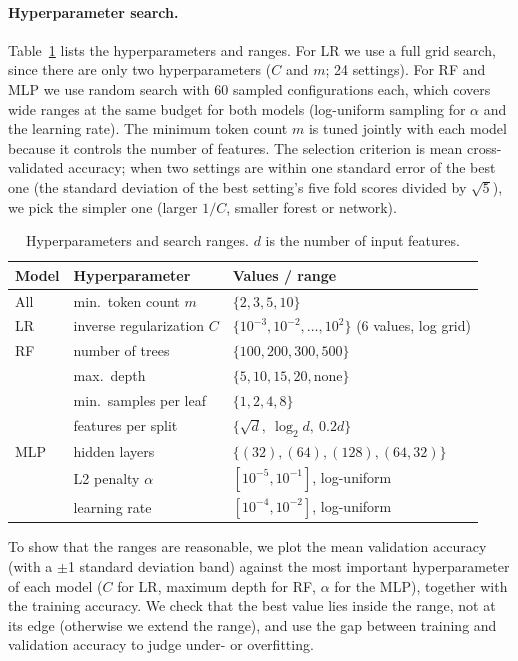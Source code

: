 \documentclass[11pt,letterpaper]{article}
\begin{document}
\paragraph{Hyperparameter search.}
Table~\ref{tab:hparams} lists the hyperparameters and ranges. For LR we use a full
grid search, since there are only two hyperparameters ($C$ and $m$; 24 settings).
For RF and MLP we use random search with 60 sampled configurations each, which
covers wide ranges at the same budget for both models (log-uniform sampling for
$\alpha$ and the learning rate). The minimum token count $m$ is tuned jointly with
each model because it controls the number of features. The selection criterion is
mean cross-validated accuracy; when two settings are within one standard error of
the best one (the standard deviation of the best setting's five fold scores divided
by $\sqrt{5}$), we pick the simpler one (larger $1/C$, smaller forest or network).

\begin{table}[h]
\centering\small
\begin{tabular}{@{}lll@{}}
\toprule
Model & Hyperparameter & Values / range\\
\midrule
All & min.\ token count $m$ & $\{2, 3, 5, 10\}$\\
\midrule
LR  & inverse regularization $C$ & $\{10^{-3}, 10^{-2}, \dots, 10^{2}\}$ (6 values, log grid)\\
\midrule
RF  & number of trees & $\{100, 200, 300, 500\}$\\
    & max.\ depth & $\{5, 10, 15, 20, \text{none}\}$\\
    & min.\ samples per leaf & $\{1, 2, 4, 8\}$\\
    & features per split & $\{\sqrt{d},\ \log_2 d,\ 0.2d\}$\\
\midrule
MLP & hidden layers & $\{(32), (64), (128), (64, 32)\}$\\
    & L2 penalty $\alpha$ & $[10^{-5}, 10^{-1}]$, log-uniform\\
    & learning rate & $[10^{-4}, 10^{-2}]$, log-uniform\\
\bottomrule
\end{tabular}
\caption{Hyperparameters and search ranges. $d$ is the number of input features.}
\label{tab:hparams}
\end{table}

To show that the ranges are reasonable, we plot the mean validation accuracy (with
a $\pm$1 standard deviation band) against the most important hyperparameter of each
model ($C$ for LR, maximum depth for RF, $\alpha$ for the MLP), together with the
training accuracy. We check that the best value lies inside the range, not at its
edge (otherwise we extend the range), and use the gap between training and
validation accuracy to judge under- or overfitting.
\end{document}
